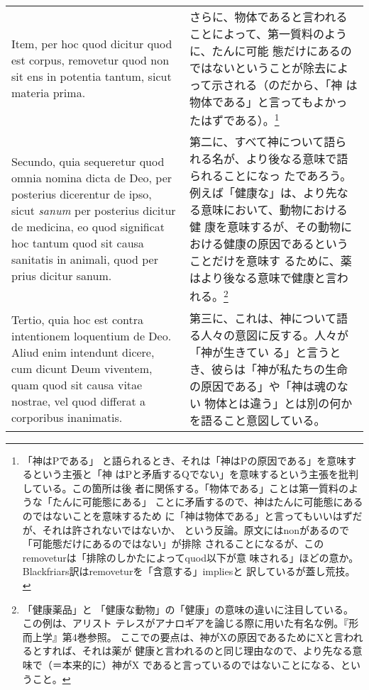 \documentclass[paper=a4paper,fontsize=10pt,jafontsize=9pt,titlepage]{jlreq}
\begin{document}
\begin{longtable}{p{21em}p{21em}}
\\

Item, per hoc quod dicitur quod est corpus, removetur quod non sit ens
in potentia tantum, sicut materia prima.

&

さらに、物体であると言われることによって、第一質料のように、たんに可能
態だけにあるのではないということが除去によって示される（のだから、「神
は物体である」と言ってもよかったはずである）。\footnote{「神はPである」
と語られるとき、それは「神はPの原因である」を意味するという主張と「神
はPと矛盾するQでない」を意味するという主張を批判している。この箇所は後
者に関係する。「物体である」ことは第一質料のような「たんに可能態にある」
ことに矛盾するので、神はたんに可能態にあるのではないことを意味するため
に「神は物体である」と言ってもいいはずだが、それは許されないではないか、
という反論。原文にはnonがあるので「可能態だけにあるのではない」が排除
されることになるが、このremoveturは「排除のしかたによってquod以下が意
味される」ほどの意か。Blackfriars訳はremoveturを「含意する」impliesと
訳しているが蓋し荒技。}

\\

Secundo, quia sequeretur quod omnia nomina dicta de Deo, per posterius
dicerentur de ipso, sicut {\itshape sanum} per posterius dicitur de
medicina, eo quod significat hoc tantum quod sit causa sanitatis in
animali, quod per prius dicitur sanum.

&

第二に、すべて神について語られる名が、より後なる意味で語られることになっ
たであろう。例えば「健康な」は、より先なる意味において、動物における健
康を意味するが、その動物における健康の原因であるということだけを意味す
るために、薬はより後なる意味で健康と言われる。\footnote{「健康薬品」と
「健康な動物」の「健康」の意味の違いに注目している。この例は、アリスト
テレスがアナロギアを論じる際に用いた有名な例。『形而上学』第4巻参照。
ここでの要点は、神がXの原因であるためにXと言われるとすれば、それは薬が
健康と言われるのと同じ理由なので、より先なる意味で（＝本来的に）神がX
であると言っているのではないことになる、ということ。}

\\

Tertio, quia hoc est contra intentionem loquentium de Deo. Aliud enim
intendunt dicere, cum dicunt Deum viventem, quam quod sit causa vitae
nostrae, vel quod differat a corporibus inanimatis.

&

第三に、これは、神について語る人々の意図に反する。人々が「神が生きてい
る」と言うとき、彼らは「神が私たちの生命の原因である」や「神は魂のない
物体とは違う」とは別の何かを語ること意図している。


\end{longtable}
\end{document}
